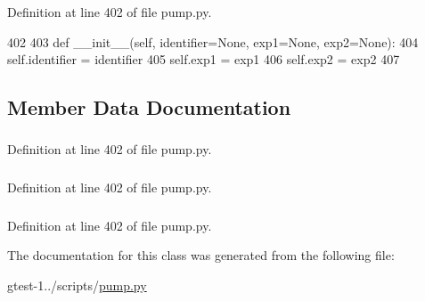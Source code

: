 \-Definition at line 402 of file pump.\-py.


\begin{DoxyCode}
402 
403   def __init__(self, identifier=None, exp1=None, exp2=None):
404     self.identifier = identifier
405     self.exp1 = exp1
406     self.exp2 = exp2
407 

\end{DoxyCode}


\subsection{\-Member \-Data \-Documentation}
\hypertarget{classpump_1_1RangeNode_a2669d6bdd8f8a5feb2a310835a68ee67}{
\subsubsection[{exp1}]{}}\label{de/dc9/classpump_1_1RangeNode_a2669d6bdd8f8a5feb2a310835a68ee67}


\-Definition at line 402 of file pump.\-py.

\hypertarget{classpump_1_1RangeNode_ad4fd52950722eafd3a3994efd6f37edc}{
\subsubsection[{exp2}]{}}\label{de/dc9/classpump_1_1RangeNode_ad4fd52950722eafd3a3994efd6f37edc}


\-Definition at line 402 of file pump.\-py.

\hypertarget{classpump_1_1RangeNode_afc486b0767ef05e2dc12f5b98be72902}{
\subsubsection[{identifier}]{}}\label{de/dc9/classpump_1_1RangeNode_afc486b0767ef05e2dc12f5b98be72902}


\-Definition at line 402 of file pump.\-py.



\-The documentation for this class was generated from the following file\-:\begin{DoxyCompactItemize}
\item 
gtest-\/1../scripts/\hyperlink{pump_8py}{pump.\-py}\end{DoxyCompactItemize}
